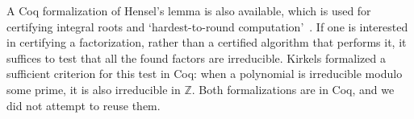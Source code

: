 \documentclass[11pt,a4paper]{article}
\begin{document}
A Coq formalization of Hensel's lemma is also available, %
which is used for certifying integral roots and `hardest-to-round computation'~\cite{Martin-Dorel2015}.
If one is interested in certifying a factorization,
rather than a certified algorithm that performs it,
it suffices to test that all the found factors are irreducible.
Kirkels \cite{kirkels2004} formalized a sufficient criterion for this test in Coq:
when a polynomial is irreducible modulo some prime, it is also irreducible in $\mathbb{Z}$.
Both formalizations are in Coq, and we did not attempt to reuse them.







\end{document}
